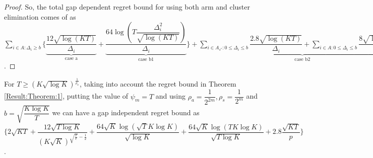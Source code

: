 \begin{proof}
So, the total gap dependent regret bound for using both arm and cluster elimination comes of as $ \sum_{i\in A:\Delta_{i}\geq b}\bigg\lbrace\underbrace{\dfrac{12\sqrt{\log (KT)}}{\Delta_{i}} }_{\text{case a}} + \underbrace{\dfrac{64\log{(T\dfrac{\Delta_{i}^{2}}{\sqrt{\log (KT)}})}}{\Delta_{i}}}_{\text{case b1}}\bigg\rbrace + \underbrace{\sum\limits_{i\in A_{s^{*}}:0\leq\Delta_{i}\leq b}\dfrac{2.8\sqrt{\log (KT)}}{\Delta_{i}} + \sum\limits_{i\in A:0\leq\Delta_{i}\leq b}\dfrac{8\sqrt{\log (KT)}}{\Delta_{i}}}_{\text{case b2}} $.
\end{proof}

\begin{corollary}
For $T\geq (K\sqrt{\log K})^{\frac{1}{\rho_{a}}}$, taking into account the regret bound in Theorem \ref{Result:Theorem:1}, putting the value of $\psi_{m}=T$ and using $\rho_{a}=\dfrac{1}{2^{2m}},\rho_{s}=\dfrac{1}{2^{m}} $ and $b=\sqrt{\dfrac{K\log K}{T}}$ we can have a gap independent regret bound as $\bigg\lbrace 2\sqrt{KT} + \dfrac{12\sqrt{T\log K}}{(K\sqrt{K})^{\sqrt{\frac{T}{e}}-\frac{1}{2}}} + \dfrac{64\sqrt{K}\log{(\sqrt{T}K\log K)}}{\sqrt{\log K}} + \dfrac{64\sqrt{K}\log{(TK\log K)}}{\sqrt{T\log K}} + 2.8\dfrac{\sqrt{KT}}{p} \bigg\rbrace$.
\end{corollary}

